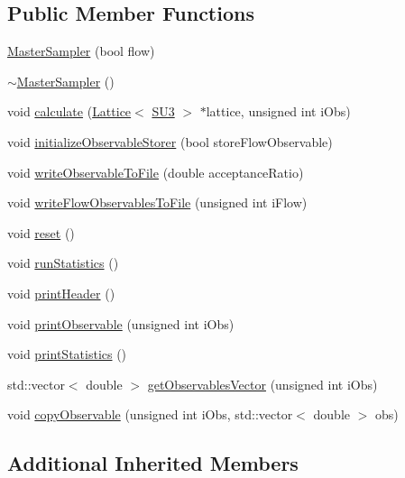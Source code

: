 \subsection*{Public Member Functions}
\begin{DoxyCompactItemize}
\item 
\mbox{\hyperlink{class_master_sampler_ac5ee503e8391aca36f73872a45bb6bd9}{Master\+Sampler}} (bool flow)
\item 
\mbox{\hyperlink{class_master_sampler_a040e460a888f8dc066de84563f83caa6}{$\sim$\+Master\+Sampler}} ()
\item 
void \mbox{\hyperlink{class_master_sampler_ad3cc7e36498dbf4a39238de3ac59ae8b}{calculate}} (\mbox{\hyperlink{class_lattice}{Lattice}}$<$ \mbox{\hyperlink{class_s_u3}{S\+U3}} $>$ $\ast$lattice, unsigned int i\+Obs)
\item 
void \mbox{\hyperlink{class_master_sampler_a88e2eec68ea6bd60cc3f375ac04a8ded}{initialize\+Observable\+Storer}} (bool store\+Flow\+Observable)
\item 
void \mbox{\hyperlink{class_master_sampler_a638714c38e1a6252ab8b6be1fa224bd4}{write\+Observable\+To\+File}} (double acceptance\+Ratio)
\item 
void \mbox{\hyperlink{class_master_sampler_ad475928217ac61fae134128904aaa9f8}{write\+Flow\+Observables\+To\+File}} (unsigned int i\+Flow)
\item 
void \mbox{\hyperlink{class_master_sampler_a275a032513db03c899056fd07d71cc89}{reset}} ()
\item 
void \mbox{\hyperlink{class_master_sampler_ab7913d0dbdea57af3f469a3cdd74f8fc}{run\+Statistics}} ()
\item 
void \mbox{\hyperlink{class_master_sampler_a51b207672764c100e1ae258fd2e33fcf}{print\+Header}} ()
\item 
void \mbox{\hyperlink{class_master_sampler_a41853c3e4ab52fca7d93cf80e8702b7a}{print\+Observable}} (unsigned int i\+Obs)
\item 
void \mbox{\hyperlink{class_master_sampler_a9accfc83c05d3013396355e40257a562}{print\+Statistics}} ()
\item 
std\+::vector$<$ double $>$ \mbox{\hyperlink{class_master_sampler_a471dffa3f29c68b4152b195708a9a5ac}{get\+Observables\+Vector}} (unsigned int i\+Obs)
\item 
void \mbox{\hyperlink{class_master_sampler_a893be9ba7dca98cb8d9d3cb30e42fcc3}{copy\+Observable}} (unsigned int i\+Obs, std\+::vector$<$ double $>$ obs)
\end{DoxyCompactItemize}
\subsection*{Additional Inherited Members}


